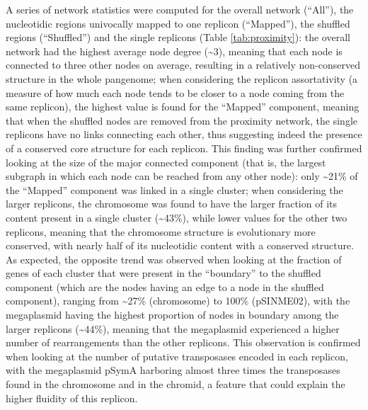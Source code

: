 A series of network statistics were computed for the overall network (“All”), the nucleotidic regions univocally mapped to one replicon (“Mapped”), the shuffled regions (“Shuffled”) and the single replicons (Table \ref{tab:proximity}): the overall network had the highest average node degree (\textasciitilde 3), meaning that each node is connected to three other nodes on average, resulting in a relatively non-conserved structure in the whole pangenome; when considering the replicon assortativity (a measure of how much each node tends to be closer to a node coming from the same replicon), the highest value is found for the “Mapped” component, meaning that when the shuffled nodes are removed from the proximity network, the single replicons have no links connecting each other, thus suggesting indeed the presence of a conserved core structure for each replicon. This finding was further confirmed looking at the size of the major connected component (that is, the largest subgraph in which each node can be reached from any other node): only \textasciitilde 21\% of the “Mapped” component was linked in a single cluster; when considering the larger replicons, the chromosome was found to have the larger fraction of its content present in a single cluster (\textasciitilde 43\%), while lower values for the other two replicons, meaning that the chromosome structure is evolutionary more conserved, with nearly half of its nucleotidic content with a conserved structure. As expected, the opposite trend was observed when looking at the fraction of genes of each cluster that were present in the “boundary” to the shuffled component (which are the nodes having an edge to a node in the shuffled component), ranging from \textasciitilde 27\% (chromosome) to 100\% (pSINME02), with the megaplasmid having the highest proportion of nodes in boundary among the larger replicons (\textasciitilde 44\%), meaning that the megaplasmid experienced a higher number of rearrangements than the other replicons. This observation is confirmed when looking at the number of putative transposases encoded in each replicon, with the megaplasmid pSymA harboring almost three times the transposases found in the chromosome and in the chromid, a feature that could explain the higher fluidity of this replicon.
